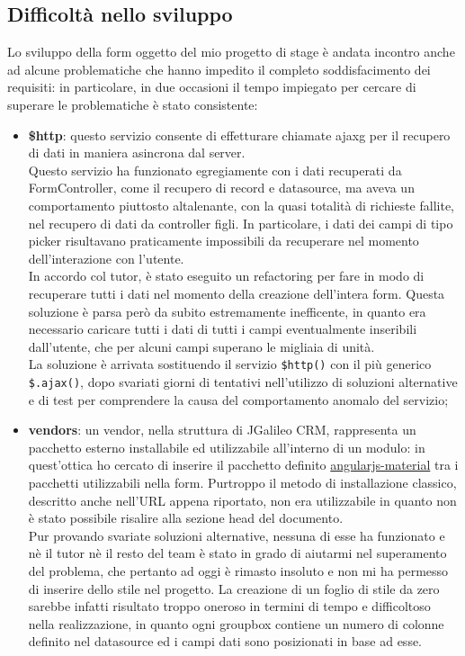 \subsection{Difficoltà nello sviluppo}
\label{cap: diff_sviluppo}
Lo sviluppo della form oggetto del mio progetto di stage è andata incontro anche ad alcune problematiche che hanno impedito il completo soddisfacimento dei requisiti: in particolare, in due occasioni il tempo impiegato per cercare di superare le problematiche è stato consistente:
\begin{itemize}
	\item \textbf{\$http}: questo servizio consente di effetturare chiamate \gls{ajaxg} per il recupero di dati in maniera asincrona dal server.\\
	Questo servizio ha funzionato egregiamente con i dati recuperati da FormController, come il recupero di record e datasource, ma aveva un comportamento piuttosto altalenante, con la quasi totalità di richieste fallite, nel recupero di dati da controller figli. In particolare, i dati dei campi di tipo picker risultavano praticamente impossibili da recuperare nel momento dell'interazione con l'utente.\\
	In accordo col tutor, è stato eseguito un refactoring per fare in modo di recuperare tutti i dati nel momento della creazione dell'intera form. Questa soluzione è parsa però da subito estremamente inefficente, in quanto era necessario caricare tutti i dati di tutti i campi eventualmente inseribili dall'utente, che per alcuni campi superano le migliaia di unità. \\
	La soluzione è arrivata sostituendo il servizio \lstinline[language=HTML]!$http()! con il più generico \lstinline[language=HTML]!$.ajax()!, dopo svariati giorni di tentativi nell'utilizzo di soluzioni alternative e di test per comprendere la causa del comportamento anomalo del servizio;
	\item \textbf{vendors}: un vendor, nella struttura di JGalileo CRM, rappresenta un pacchetto esterno installabile ed utilizzabile all'interno di un modulo: in quest'ottica ho cercato di inserire il pacchetto definito \href{https://github.com/angular/material}{angularjs-material} tra i pacchetti utilizzabili nella form. Purtroppo il metodo di installazione classico, descritto anche nell'URL appena riportato, non era utilizzabile in quanto non è stato possibile risalire alla sezione head del documento.\\ Pur provando svariate soluzioni alternative, nessuna di esse ha funzionato e nè il tutor nè il resto del team è stato in grado di aiutarmi nel superamento del problema, che pertanto ad oggi è rimasto insoluto e non mi ha permesso di inserire dello stile nel progetto. La creazione di un foglio di stile da zero sarebbe infatti risultato troppo oneroso in termini di tempo e difficoltoso nella realizzazione, in quanto ogni groupbox contiene un numero di colonne definito nel datasource ed i campi dati sono posizionati in base ad esse.
\end{itemize}
\newpage
